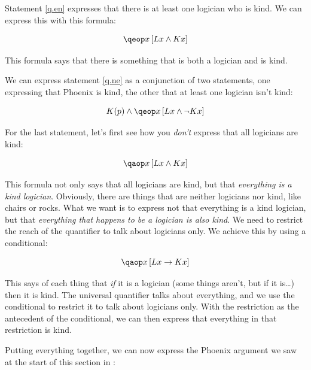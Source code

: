 \documentclass[PHIL101-Textbook.tex]{subfiles}
\begin{document}
Statement \ref{q.en} expresses that there is at least one logician who is kind. We can express this with this formula:

$$\qeb{x}{L x  \eand \atom K x}$$

\noindent This formula says that there is something that is both a logician and is kind. 

\noindent  We can express statement \ref{q.ne} as a conjunction of two statements, one expressing that Phoenix is kind, the other that at least one logician isn't kind:

$$K(p) \eand \qeb{x}{L x  \eand \enot \atom K x}$$

\noindent For the last statement, let's first see how you \emph{don't} express that all logicians are kind:

$$ \qab{x}{L x  \eand \atom K x}$$

\noindent This formula not only says that all logicians are kind, but that \emph{everything is a kind logician}. Obviously, there are things that are neither logicians nor kind, like chairs or rocks. What we want is to express not that everything is a kind logician, but that \emph{everything that happens to be a logician is also kind}. We need to restrict the reach of the quantifier to talk about logicians only. We achieve this by using a conditional:

$$ \qab{x}{L x  \eif K x }$$

\noindent This says of each thing that \emph{if} it is a logician (some things aren't, but if it is\dots) then it is kind. The universal quantifier talks about everything, and we use the conditional to restrict it to talk about logicians only. With the restriction as the antecedent of the conditional, we can then express that everything in that restriction is kind. 


Putting everything together, we can now express the Phoenix argument we saw at the start of this section in \pl:
\end{document}
